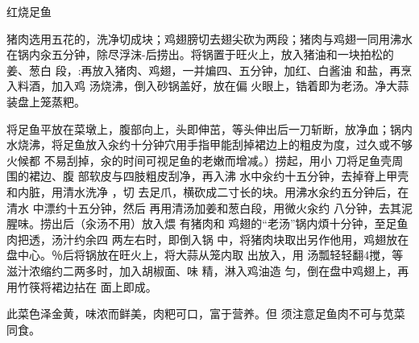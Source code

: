 \begin{recipe}{红烧足鱼}

\ingredients


\cooking

\step 猪肉选用五花的，洗净切成块；鸡翅膀切去翅尖砍为两段；猪肉与鸡翅一同用沸水
在锅内汆五分钟，除尽浮沫-后捞出。将锅置于旺火上，放入猪油和一块拍松的姜、葱白
段，:再放入猪肉、鸡翅，一并煸四、五分钟，加红、白酱油 和盐，再烹入料酒，加入鸡
汤烧沸，倒入砂锅盖好，放在偏 火眼上，锆着即为老汤。净大蒜装盘上笼蒸粑。

\step 将足鱼平放在菜墩上，腹部向上，头即伸茁，等头伸出后一刀斩断，放净血；锅内
水烧沸，将足鱼放入汆约十分钟穴用手指甲能刮掉裙边上的粗皮为度，过久或不够火候都
不易刮掉，汆的时间可视足鱼的老嫩而增减。）捞起，用小 刀将足鱼壳周围的裙边、腹
部软皮与四肢粗皮刮净，再入沸 水中汆约十五分钟，去掉脊上甲壳和内脏，用清水洗净
，切 去足爪，横砍成二寸长的块。用沸水汆约五分钟后，在清水 中漂约十五分钟，然后
再用清汤加姜和葱白段，用微火汆约 八分钟，去其泥腥味。捞出后（汆汤不用）放入煨
有猪肉和 鸡翅的“老汤”锅内煩十分钟，至足鱼肉把透，汤汁约余四 两左右时，即倒入锅
中，将猪肉块取出另作他用，鸡翅放在 盘中心。％后将锅放在旺火上，将大蒜从笼内取
出放入，用 汤瓢轻轻翻4搅，等滋汁浓缩约二两多时，加入胡椒面、味 精，淋入鸡油造
匀，倒在盘中鸡翅上，再用竹筷将裙边拈在 面上即成。

\features

此菜色泽金黄，味浓而鲜美，肉粑可口，富于营养。但 须注意足鱼肉不可与苋菜同食。

\end{recipe}

